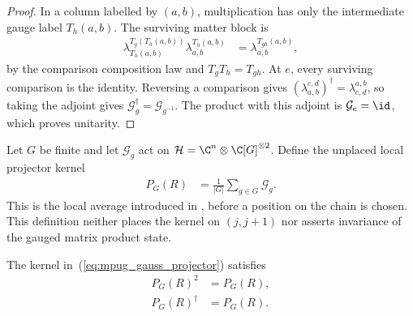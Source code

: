 \begin{proof}\leanok
    In a column labelled by $(a,b)$, multiplication has only the intermediate
    gauge label $T_h(a,b)$. The surviving matter block is
    \begin{align}
        \lambda_{T_h(a,b)}^{T_g(T_h(a,b))}
        \lambda_{a,b}^{T_h(a,b)}
         & =\lambda_{a,b}^{T_{gh}(a,b)},
    \end{align}
    by the comparison composition law and
    $T_gT_h=T_{gh}$. At $e$, every surviving comparison is the identity.
    Reversing a comparison gives
    $(\lambda_{a,b}^{c,d})^\dagger=\lambda_{c,d}^{a,b}$, so taking the adjoint
    gives $\mathcal G_g^\dagger=\mathcal G_{g^{-1}}$. The product with this
    adjoint is $\mathcal G_e=\id$, which proves unitarity.
\end{proof}

\begin{definition}
    \label{def:mpug_gauss_projector}
    \leanok
    Let $G$ be finite and let $\mathcal G_g$ act on
    $\mathcal H=\C^n\otimes\C[G]^{\otimes2}$. Define the unplaced local
    projector kernel
    \begin{align}
        P_G(R) & =\frac{1}{|G|}\sum_{g\in G}\mathcal G_g.
        \label{eq:mpug_gauss_projector}
    \end{align}
    This is the local average introduced in
    \cite[lines~3494--3499]{FrancoRubio2025MPUGauging}, before a position on
    the chain is chosen. This definition neither places the kernel on
    $(j,j+1)$ nor asserts invariance of the gauged matrix product state.
\end{definition}

\begin{lemma}
    \label{thm:mpug_gauss_projector_projection}
    \leanok
    The kernel in~(\ref{eq:mpug_gauss_projector}) satisfies
    \begin{align}
        P_G(R)^2       & =P_G(R), \\
        P_G(R)^\dagger & =P_G(R).
    \end{align}
\end{lemma}

